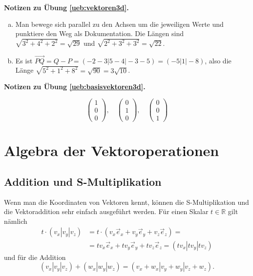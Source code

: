 \documentclass[%
11pt,%
twoside,%
titlepage,%
german,%
headsepline%
]{scrartcl}
\theoremstyle{definition}
\theoremstyle{plain}
\newcommand{\concatueb}[1]{ueb:#1}%
\newcommand{\concatlsg}[1]{lsg:#1}%
\newenvironment{lsg}[1]{%
    \par\noindent\textbf{Notizen zu Übung \ref{\concatueb{#1}}.}%
    \label{\concatlsg{#1}}
}{%
    \par%
}
\begin{document}
\begin{lsg}{vektoren3d}
    \begin{enumerate}[a)]
        \item Man bewege sich parallel zu den Achsen um die jeweiligen Werte und punktiere den Weg als Dokumentation. Die Längen sind $\sqrt{3^2+4^2+2^2}=\sqrt{29}$ und $\sqrt{2^2+3^2+3^2}=\sqrt{22}$.
        \item Es ist $\vec{PQ}=Q-P=(-2-3|5-4|-3-5)=(-5|1|-8)$, also die Länge $\sqrt{5^2+1^2+8^2}=\sqrt{90}=3\sqrt{10}$.
    \end{enumerate}
\end{lsg}
\begin{lsg}{basisvektoren3d}
    $$\begin{pmatrix}
        1\\0\\0
    \end{pmatrix},\quad\begin{pmatrix}
        0\\1\\0
    \end{pmatrix},\quad\begin{pmatrix}
        0\\0\\1
    \end{pmatrix}$$
\end{lsg}

\clearpage

\section{Algebra der Vektoroperationen}

\subsection{Addition und S-Multiplikation}

Wenn man die Koordinaten von Vektoren kennt, können die S-Multiplikation und die Vektoraddition sehr einfach ausgeführt werden. Für
einen Skalar $t\in\mathbb{R}$ gilt nämlich
\begin{align*}
t\cdot(v_x|v_y|v_z)&=t\cdot(v_x\vec{e}_x+v_y\vec{e}_y+v_z\vec{e}_z)=\\
&=tv_x\vec{e}_x+tv_y\vec{e}_y+tv_z\vec{e}_z=(tv_x|tv_y|tv_z)
\end{align*}
und für die Addition
$$(v_x|v_y|v_z)+(w_x|w_y|w_z)=(v_x+w_x|v_y+w_y|v_z+w_z).$$
\end{document}
